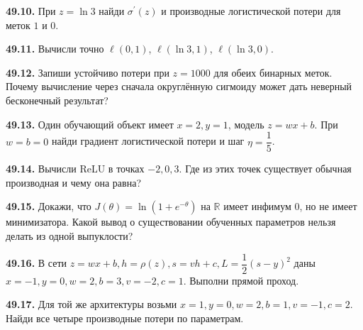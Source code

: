 \noindent\begin{minipage}[t]{\linewidth}\textbf{49.10.} При \(z=\ln3\) найди \(\sigma^{\prime}(z)\) и производные логистической потери для меток \(1\) и \(0\).\par\end{minipage}\par
\noindent\begin{minipage}[t]{\linewidth}\textbf{49.11.} Вычисли точно \(\ell(0,1)\), \(\ell(\ln3,1)\), \(\ell(\ln3,0)\).\par\end{minipage}\par
\noindent\begin{minipage}[t]{\linewidth}\textbf{49.12.}\starmark{} Запиши устойчиво потери при \(z=1000\) для обеих бинарных меток. Почему вычисление через сначала округлённую сигмоиду может дать неверный бесконечный результат?\par\end{minipage}\par
\noindent\begin{minipage}[t]{\linewidth}\textbf{49.13.} Один обучающий объект имеет \(x=2,y=1\), модель \(z=wx+b\). При \(w=b=0\) найди градиент логистической потери и шаг \(\eta=\dfrac15\).\par\end{minipage}\par
\noindent\begin{minipage}[t]{\linewidth}\textbf{49.14.} Вычисли ReLU в точках \(-2,0,3\). Где из этих точек существует обычная производная и чему она равна?\par\end{minipage}\par
\noindent\begin{minipage}[t]{\linewidth}\textbf{49.15.}\starmark{} Докажи, что \(J(\theta)=\ln(1+e^{-\theta})\) на \(\mathbb R\) имеет инфимум \(0\), но не имеет минимизатора. Какой вывод о существовании обученных параметров нельзя делать из одной выпуклости?\par\end{minipage}\par
\noindent\begin{minipage}[t]{\linewidth}\textbf{49.16.} В сети \(z=wx+b,h=\rho(z),s=vh+c,L=\dfrac12(s-y)^2\) даны \(x=-1,y=0,w=2,b=3,v=-2,c=1\). Выполни прямой проход.\par\end{minipage}\par
\noindent\begin{minipage}[t]{\linewidth}\textbf{49.17.}\starmark{} Для той же архитектуры возьми \(x=1,y=0,w=2,b=1,v=-1,c=2\). Найди все четыре производные потери по параметрам.\par\end{minipage}\par
